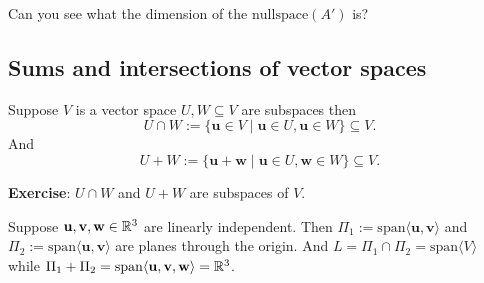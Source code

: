 \documentclass[10pt, a4paper]{article}
\newcommand{\mbf}[1]{\mathbf{#1}}
\begin{document}
Can you see what the dimension of the $\mathrm{nullspace}(A')$ is?

\subsection{Sums and intersections of vector spaces}
\begin{definition}
    Suppose $V$ is a vector space $U, W \subseteq V$ are subspaces then
    \[
    U \cap W := \{\mbf{u} \in V\mid \mbf{u} \in U, \mbf{u} \in W\} \subseteq V.
    \]
    And
    \[
    U + W := \{\mbf{u} + \mbf{w} \mid \mbf{u} \in U, \mbf{w} \in W\} \subseteq V.
    \]
\end{definition}

\textbf{Exercise}: $U \cap W$ and $U + W$ are subspaces of $V$.

\begin{example}
    Suppose $\mbf{u, v, w} \in \R ^ 3$ are linearly independent.
    Then $\Pi_1 := \mathrm{span}\langle\mbf{u, v}\rangle$ and $\Pi_2 := \mathrm{span}\langle\mbf{u, v}\rangle$ are planes through the origin.
    And $L = \Pi_1 \cap \Pi_2 = \mathrm{span}\langle V \rangle$ while $\Pi_1 + \Pi_2 = \mathrm{span}\langle\mbf{u, v, w}\rangle = \R ^ 3$.
\end{example}
\end{document}
